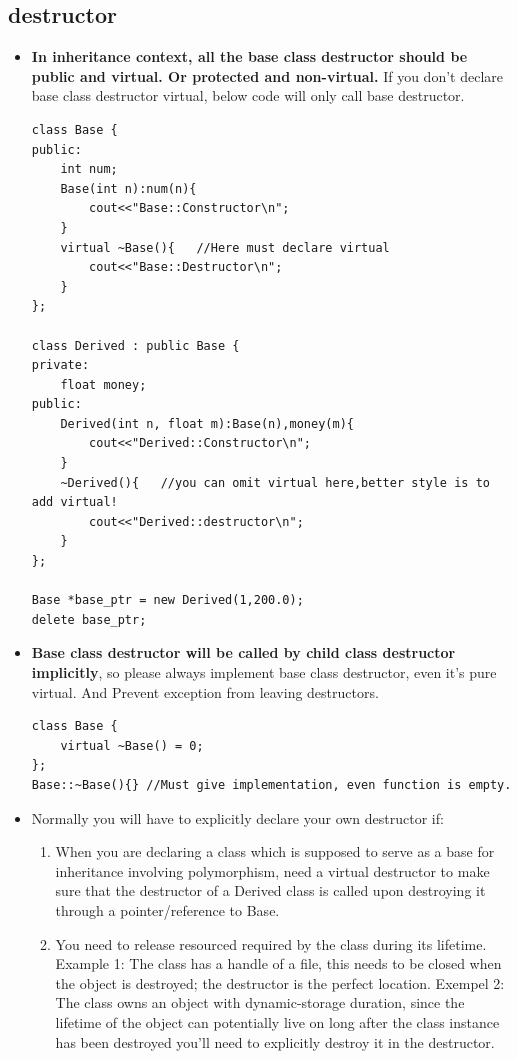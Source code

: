 \documentclass[a4paper,11pt,twoside]{book}
\begin{document}
\subsection{destructor}
\begin{itemize}
	\item \textbf{In inheritance context, all the base class destructor should be public and virtual. Or protected and non-virtual.}  If you don't declare base class destructor virtual, below code will only call base destructor. 

\begin{lstlisting}[numbers=none]
class Base {
public:
	int num;
	Base(int n):num(n){
		cout<<"Base::Constructor\n";
	}
	virtual ~Base(){   //Here must declare virtual
		cout<<"Base::Destructor\n";
	}
};

class Derived : public Base {
private:
	float money;
public:
	Derived(int n, float m):Base(n),money(m){
		cout<<"Derived::Constructor\n";
	}
	~Derived(){   //you can omit virtual here,better style is to add virtual!
		cout<<"Derived::destructor\n";
	}
};

Base *base_ptr = new Derived(1,200.0);
delete base_ptr;
\end{lstlisting}
	

	\item \textbf{Base class destructor will be called by child class destructor implicitly}, so please always implement base class destructor, even it's pure virtual. And Prevent exception from leaving destructors.
\begin{lstlisting}[numbers=none]
class Base {
	virtual ~Base() = 0;
};
Base::~Base(){} //Must give implementation, even function is empty. 
\end{lstlisting}	

	\item Normally you will have to explicitly declare your own destructor if:

	\begin{enumerate}
		\item When you are declaring a class which is supposed to serve as a base for inheritance involving polymorphism, need a virtual destructor to make sure that the destructor of a Derived class is called upon destroying it through a pointer/reference to Base.
		
		\item You need to release resourced required by the class during its lifetime. Example 1: The class has a handle of a file, this needs to be closed when the object is destroyed; the destructor is the perfect location. Exempel 2: The class owns an object with dynamic-storage duration, since the lifetime of the object can potentially live on long after the class instance has been destroyed you'll need to explicitly destroy it in the destructor.
	\end{enumerate}
\end{itemize}
\end{document}
